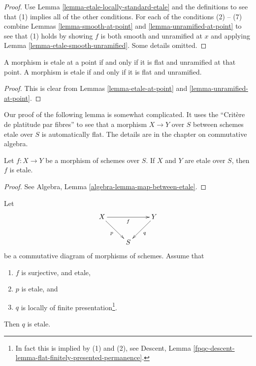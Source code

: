 \begin{proof}
Use Lemma \ref{lemma-etale-locally-standard-etale}
and the definitions to see that (1) implies all
of the other conditions. For each of the conditions
(2) -- (7) combine Lemmas \ref{lemma-smooth-at-point}
and \ref{lemma-unramified-at-point} to see
that (1) holds by showing $f$ is both smooth and unramified
at $x$ and applying Lemma \ref{lemma-etale-smooth-unramified}.
Some details omitted.
\end{proof}

\begin{lemma}
\label{lemma-flat-unramified-etale}
A morphism is etale at a point if and only if it is flat and unramified
at that point.
A morphism is etale if and only if it is flat and unramified.
\end{lemma}

\begin{proof}
This is clear from Lemmas \ref{lemma-etale-at-point}
and \ref{lemma-unramified-at-point}.
\end{proof}

\noindent
Our proof of the following lemma is somewhat complicated.
It uses the ``Crit\`ere de platitude par fibres'' to see that
a morphism $X \to Y$ over $S$ between schemes etale over $S$
is automatically flat. The details are in the chapter on commutative algebra.

\begin{lemma}
\label{lemma-etale-permanence}
Let $f : X \to Y$ be a morphism of schemes over $S$.
If $X$ and $Y$ are etale over $S$, then
$f$ is etale.
\end{lemma}

\begin{proof}
See Algebra, Lemma \ref{algebra-lemma-map-between-etale}.
\end{proof}

\begin{lemma}
\label{lemma-etale-permanence-two}
Let
$$
\xymatrix{
X \ar[rr]_f \ar[rd]_p & &
Y \ar[dl]^q \\
& S
}
$$
be a commutative diagram of morphisms of schemes. Assume that
\begin{enumerate}
\item $f$ is surjective, and etale,
\item $p$ is etale, and
\item $q$ is locally of finite presentation\footnote{In fact this
is implied by (1) and (2), see
Descent, Lemma \ref{fpqc-descent-lemma-flat-finitely-presented-permanence}.}.
\end{enumerate}
Then $q$ is etale.
\end{lemma}

